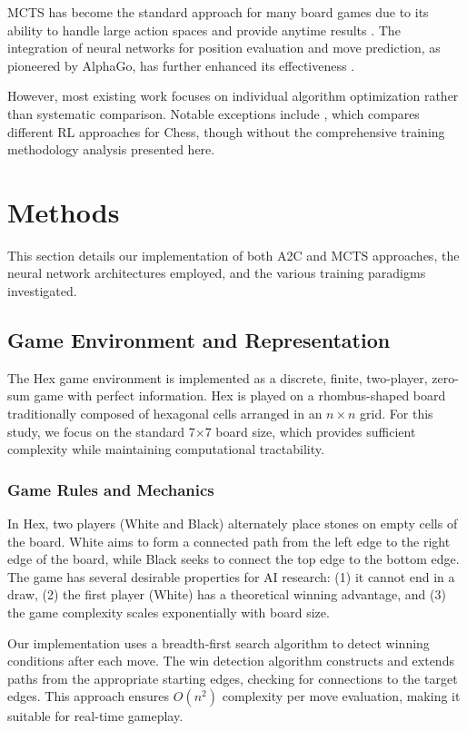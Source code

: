 \documentclass[conference]{IEEEtran}
\begin{document}
MCTS has become the standard approach for many board games due to its ability to handle large action spaces and provide anytime results \cite{mcts_survey}. The integration of neural networks for position evaluation and move prediction, as pioneered by AlphaGo, has further enhanced its effectiveness \cite{alphago}.

However, most existing work focuses on individual algorithm optimization rather than systematic comparison. Notable exceptions include \cite{comparison_study}, which compares different RL approaches for Chess, though without the comprehensive training methodology analysis presented here.

\section{Methods}

This section details our implementation of both A2C and MCTS approaches, the neural network architectures employed, and the various training paradigms investigated.

\subsection{Game Environment and Representation}

The Hex game environment is implemented as a discrete, finite, two-player, zero-sum game with perfect information. Hex is played on a rhombus-shaped board traditionally composed of hexagonal cells arranged in an $n \times n$ grid. For this study, we focus on the standard 7×7 board size, which provides sufficient complexity while maintaining computational tractability.

\subsubsection{Game Rules and Mechanics}

In Hex, two players (White and Black) alternately place stones on empty cells of the board. White aims to form a connected path from the left edge to the right edge of the board, while Black seeks to connect the top edge to the bottom edge. The game has several desirable properties for AI research: (1) it cannot end in a draw, (2) the first player (White) has a theoretical winning advantage, and (3) the game complexity scales exponentially with board size.

Our implementation uses a breadth-first search algorithm to detect winning conditions after each move. The win detection algorithm constructs and extends paths from the appropriate starting edges, checking for connections to the target edges. This approach ensures $O(n^2)$ complexity per move evaluation, making it suitable for real-time gameplay.
\end{document}
